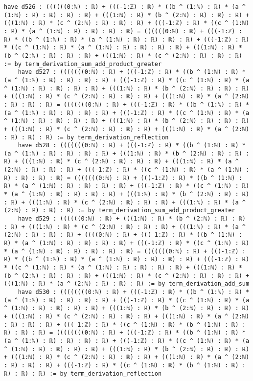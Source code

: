 \documentclass{article}
\begin{document}
\begin{tcolorbox}[colback=white!10, width=\linewidth]
\begin{lstlisting}[language=Lean4]
    have d526 : ((((((0:ℕ) : ℝ) + (((-1:ℤ) : ℝ) * ((b ^ (1:ℕ) : ℝ) * (a ^ (1:ℕ) : ℝ) : ℝ) : ℝ) : ℝ) + (((1:ℕ) : ℝ) * (b ^ (2:ℕ) : ℝ) : ℝ) : ℝ) + (((1:ℕ) : ℝ) * (c ^ (2:ℕ) : ℝ) : ℝ) : ℝ) + (((-1:ℤ) : ℝ) * ((c ^ (1:ℕ) : ℝ) * (a ^ (1:ℕ) : ℝ) : ℝ) : ℝ) : ℝ) = ((((((0:ℕ) : ℝ) + (((-1:ℤ) : ℝ) * ((b ^ (1:ℕ) : ℝ) * (a ^ (1:ℕ) : ℝ) : ℝ) : ℝ) : ℝ) + (((-1:ℤ) : ℝ) * ((c ^ (1:ℕ) : ℝ) * (a ^ (1:ℕ) : ℝ) : ℝ) : ℝ) : ℝ) + (((1:ℕ) : ℝ) * (b ^ (2:ℕ) : ℝ) : ℝ) : ℝ) + (((1:ℕ) : ℝ) * (c ^ (2:ℕ) : ℝ) : ℝ) : ℝ) := by term_derivation_sum_add_product_greater
    have d527 : (((((((0:ℕ) : ℝ) + (((-1:ℤ) : ℝ) * ((b ^ (1:ℕ) : ℝ) * (a ^ (1:ℕ) : ℝ) : ℝ) : ℝ) : ℝ) + (((-1:ℤ) : ℝ) * ((c ^ (1:ℕ) : ℝ) * (a ^ (1:ℕ) : ℝ) : ℝ) : ℝ) : ℝ) + (((1:ℕ) : ℝ) * (b ^ (2:ℕ) : ℝ) : ℝ) : ℝ) + (((1:ℕ) : ℝ) * (c ^ (2:ℕ) : ℝ) : ℝ) : ℝ) + (((1:ℕ) : ℝ) * (a ^ (2:ℕ) : ℝ) : ℝ) : ℝ) = (((((((0:ℕ) : ℝ) + (((-1:ℤ) : ℝ) * ((b ^ (1:ℕ) : ℝ) * (a ^ (1:ℕ) : ℝ) : ℝ) : ℝ) : ℝ) + (((-1:ℤ) : ℝ) * ((c ^ (1:ℕ) : ℝ) * (a ^ (1:ℕ) : ℝ) : ℝ) : ℝ) : ℝ) + (((1:ℕ) : ℝ) * (b ^ (2:ℕ) : ℝ) : ℝ) : ℝ) + (((1:ℕ) : ℝ) * (c ^ (2:ℕ) : ℝ) : ℝ) : ℝ) + (((1:ℕ) : ℝ) * (a ^ (2:ℕ) : ℝ) : ℝ) : ℝ) := by term_derivation_reflection
    have d528 : (((((((0:ℕ) : ℝ) + (((-1:ℤ) : ℝ) * ((b ^ (1:ℕ) : ℝ) * (a ^ (1:ℕ) : ℝ) : ℝ) : ℝ) : ℝ) + (((1:ℕ) : ℝ) * (b ^ (2:ℕ) : ℝ) : ℝ) : ℝ) + (((1:ℕ) : ℝ) * (c ^ (2:ℕ) : ℝ) : ℝ) : ℝ) + (((1:ℕ) : ℝ) * (a ^ (2:ℕ) : ℝ) : ℝ) : ℝ) + (((-1:ℤ) : ℝ) * ((c ^ (1:ℕ) : ℝ) * (a ^ (1:ℕ) : ℝ) : ℝ) : ℝ) : ℝ) = (((((((0:ℕ) : ℝ) + (((-1:ℤ) : ℝ) * ((b ^ (1:ℕ) : ℝ) * (a ^ (1:ℕ) : ℝ) : ℝ) : ℝ) : ℝ) + (((-1:ℤ) : ℝ) * ((c ^ (1:ℕ) : ℝ) * (a ^ (1:ℕ) : ℝ) : ℝ) : ℝ) : ℝ) + (((1:ℕ) : ℝ) * (b ^ (2:ℕ) : ℝ) : ℝ) : ℝ) + (((1:ℕ) : ℝ) * (c ^ (2:ℕ) : ℝ) : ℝ) : ℝ) + (((1:ℕ) : ℝ) * (a ^ (2:ℕ) : ℝ) : ℝ) : ℝ) := by term_derivation_sum_add_product_greater
    have d529 : ((((((0:ℕ) : ℝ) + (((1:ℕ) : ℝ) * (b ^ (2:ℕ) : ℝ) : ℝ) : ℝ) + (((1:ℕ) : ℝ) * (c ^ (2:ℕ) : ℝ) : ℝ) : ℝ) + (((1:ℕ) : ℝ) * (a ^ (2:ℕ) : ℝ) : ℝ) : ℝ) + ((((0:ℕ) : ℝ) + (((-1:ℤ) : ℝ) * ((b ^ (1:ℕ) : ℝ) * (a ^ (1:ℕ) : ℝ) : ℝ) : ℝ) : ℝ) + (((-1:ℤ) : ℝ) * ((c ^ (1:ℕ) : ℝ) * (a ^ (1:ℕ) : ℝ) : ℝ) : ℝ) : ℝ) : ℝ) = (((((((0:ℕ) : ℝ) + (((-1:ℤ) : ℝ) * ((b ^ (1:ℕ) : ℝ) * (a ^ (1:ℕ) : ℝ) : ℝ) : ℝ) : ℝ) + (((-1:ℤ) : ℝ) * ((c ^ (1:ℕ) : ℝ) * (a ^ (1:ℕ) : ℝ) : ℝ) : ℝ) : ℝ) + (((1:ℕ) : ℝ) * (b ^ (2:ℕ) : ℝ) : ℝ) : ℝ) + (((1:ℕ) : ℝ) * (c ^ (2:ℕ) : ℝ) : ℝ) : ℝ) + (((1:ℕ) : ℝ) * (a ^ (2:ℕ) : ℝ) : ℝ) : ℝ) := by term_derivation_add_sum
    have d530 : ((((((((0:ℕ) : ℝ) + (((-1:ℤ) : ℝ) * ((b ^ (1:ℕ) : ℝ) * (a ^ (1:ℕ) : ℝ) : ℝ) : ℝ) : ℝ) + (((-1:ℤ) : ℝ) * ((c ^ (1:ℕ) : ℝ) * (a ^ (1:ℕ) : ℝ) : ℝ) : ℝ) : ℝ) + (((1:ℕ) : ℝ) * (b ^ (2:ℕ) : ℝ) : ℝ) : ℝ) + (((1:ℕ) : ℝ) * (c ^ (2:ℕ) : ℝ) : ℝ) : ℝ) + (((1:ℕ) : ℝ) * (a ^ (2:ℕ) : ℝ) : ℝ) : ℝ) + (((-1:ℤ) : ℝ) * ((c ^ (1:ℕ) : ℝ) * (b ^ (1:ℕ) : ℝ) : ℝ) : ℝ) : ℝ) = ((((((((0:ℕ) : ℝ) + (((-1:ℤ) : ℝ) * ((b ^ (1:ℕ) : ℝ) * (a ^ (1:ℕ) : ℝ) : ℝ) : ℝ) : ℝ) + (((-1:ℤ) : ℝ) * ((c ^ (1:ℕ) : ℝ) * (a ^ (1:ℕ) : ℝ) : ℝ) : ℝ) : ℝ) + (((1:ℕ) : ℝ) * (b ^ (2:ℕ) : ℝ) : ℝ) : ℝ) + (((1:ℕ) : ℝ) * (c ^ (2:ℕ) : ℝ) : ℝ) : ℝ) + (((1:ℕ) : ℝ) * (a ^ (2:ℕ) : ℝ) : ℝ) : ℝ) + (((-1:ℤ) : ℝ) * ((c ^ (1:ℕ) : ℝ) * (b ^ (1:ℕ) : ℝ) : ℝ) : ℝ) : ℝ) := by term_derivation_reflection

\end{lstlisting}
\end{tcolorbox}
\end{document}
